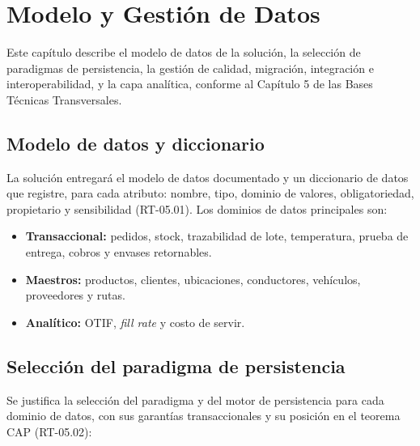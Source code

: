 \chapter{Modelo y Gestión de Datos}
\label{sec:datos}

Este capítulo describe el modelo de datos de la solución, la selección de paradigmas de
persistencia, la gestión de calidad, migración, integración e interoperabilidad, y la
capa analítica, conforme al Capítulo 5 de las Bases Técnicas Transversales.

\section{Modelo de datos y diccionario}

La solución entregará el modelo de datos documentado y un diccionario de datos que
registre, para cada atributo: nombre, tipo, dominio de valores, obligatoriedad,
propietario y sensibilidad (RT-05.01). Los dominios de datos principales son:

\begin{itemize}
  \item \textbf{Transaccional:} pedidos, stock, trazabilidad de lote, temperatura,
        prueba de entrega, cobros y envases retornables.
  \item \textbf{Maestros:} productos, clientes, ubicaciones, conductores, vehículos,
        proveedores y rutas.
  \item \textbf{Analítico:} OTIF, \emph{fill rate} y costo de servir.
\end{itemize}


\section{Selección del paradigma de persistencia}

Se justifica la selección del paradigma y del motor de persistencia para cada dominio de
datos, con sus garantías transaccionales y su posición en el teorema CAP (RT-05.02):

